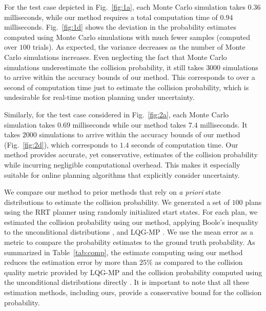 For the test case depicted in Fig.\ \ref{fig:1a}, each Monte Carlo simulation takes $0.36$ milliseconds, while our method requires a total computation time of $0.94$ milliseconds. Fig.\ \ref{fig:1d} shows the deviation in the probability estimates computed using Monte Carlo simulations with much fewer samples (computed over $100$ trials). As expected, the variance decreases as the number of Monte Carlo simulations increases. Even neglecting the fact that Monte Carlo simulations underestimate the collision probability, it still takes $3000$ simulations to arrive within the accuracy bounds of our method. This corresponds to over a second of computation time just to estimate the collision probability, which is undesirable for real-time motion planning under uncertainty.

Similarly, for the test case considered in Fig.\ \ref{fig:2a}, each Monte Carlo simulation takes $0.69$ milliseconds while our method takes $7.4$ milliseconds. It takes $2000$ simulations to arrive within the accuracy bounds of our method (Fig.\ \ref{fig:2d}), which corresponds to $1.4$ seconds of computation time. Our method provides accurate, yet conservative, estimates of the collision probability while incurring negligible computational overhead. This makes it especially suitable for online planning algorithms that explicitly consider uncertainty.

We compare our method to prior methods that rely on \emph{a priori} state distributions to estimate the collision probability. We generated a set of $100$ plans using the RRT planner using randomly initialized start states. For each plan, we estimated the collision probability using our method, applying Boole's inequality to the unconditional distributions \cite{Vitus11_ICRA}, and LQG-MP \cite{vandenBerg11_IJRR}. We use the mean error as a metric to compare the probability estimates to the ground truth probability. As summarized in Table~\ref{tab:comp}, the estimate computing using our method reduces the estimation error by more than $25\%$ as compared to the collision quality metric provided by LQG-MP \cite{vandenBerg11_IJRR} and the collision probability computed using the unconditional distributions directly \cite{Vitus11_ICRA}. It is important to note that all these estimation methods, including ours, provide a conservative bound for the collision probability.

